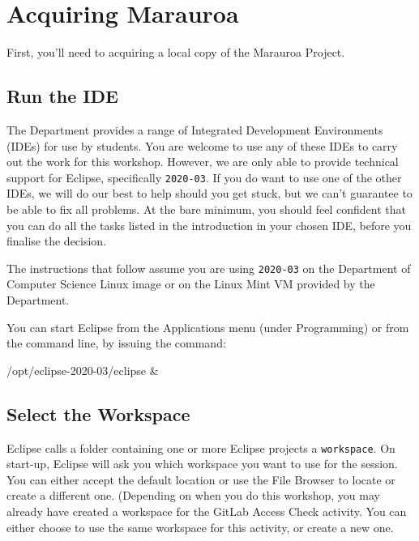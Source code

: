 \documentclass[
]{book}
\newenvironment{Shaded}{\begin{snugshade}}{\end{snugshade}}
\newcommand{\NormalTok}[1]{#1}
\begin{document}
\hypertarget{acquiring}{%
\section{Acquiring Marauroa}\label{acquiring}}

First, you'll need to acquiring a local copy of the Marauroa Project.

\hypertarget{runide}{%
\subsection{Run the IDE}\label{runide}}

The Department provides a range of Integrated Development Environments (IDEs) for use by students. You are welcome to use any of these IDEs to carry out the work for this workshop. However, we are only able to provide technical support for Eclipse, specifically \texttt{2020-03}. If you do want to use one of the other IDEs, we will do our best to help should you get stuck, but we can't guarantee to be able to fix all problems. At the bare minimum, you should feel confident that you can do all the tasks listed in the introduction in your chosen IDE, before you finalise the decision.

The instructions that follow assume you are using \texttt{2020-03} on the Department of Computer Science Linux image or on the Linux Mint VM provided by the Department.

You can start Eclipse from the Applications menu (under Programming) or from the command line, by issuing the command:

\begin{Shaded}
\begin{Highlighting}[]
\NormalTok{/opt/eclipse{-}2020{-}03/eclipse \&}
\end{Highlighting}
\end{Shaded}

\hypertarget{selectw}{%
\subsection{Select the Workspace}\label{selectw}}

Eclipse calls a folder containing one or more Eclipse projects a \texttt{workspace}. On start-up, Eclipse will ask you which workspace you want to use for the session. You can either accept the default location or use the File Browser to locate or create a different one. (Depending on when you do this workshop, you may already have created a workspace for the GitLab Access Check activity. You can either choose to use the same workspace for this activity, or create a new one.
\end{document}
